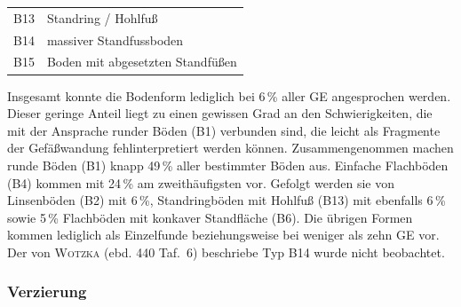 \begin{multicols}{2}
\vspace{.25em}
\noindent\begin{tabular}{@{}ll@{}}
	B13 & Standring / Hohlfuß \\
	B14 & massiver Standfussboden \\
	B15 & Boden mit abgesetzten Standfüßen \\
\end{tabular}
\vspace{1em}

\noindent Insgesamt konnte die Bodenform lediglich bei 6\,\% aller GE angesprochen werden. Dieser geringe Anteil liegt zu einen gewissen Grad an den Schwierigkeiten, die mit der Ansprache runder Böden (B1) verbunden sind, die leicht als Fragmente der Gefäßwandung fehlinterpretiert werden können. Zusammengenommen machen runde Böden (B1) knapp 49\,\% aller bestimmter Böden aus. Einfache Flachböden (B4) kommen mit 24\,\% am zweithäufigsten vor. Gefolgt werden sie von Linsenböden (B2) mit 6\,\%, Standringböden mit Hohlfuß (B13) mit ebenfalls 6\,\% sowie 5\,\% Flachböden mit konkaver Standfläche (B6). Die übrigen Formen kommen lediglich als Einzelfunde beziehungsweise bei weniger als zehn GE vor. Der von \textsc{Wotzka} (ebd. 440 Taf.~6) beschriebe Typ B14 wurde nicht beobachtet.

\subsubsection{Verzierung}\label{sec:AufnahmeVerzierungen}


\end{multicols}
